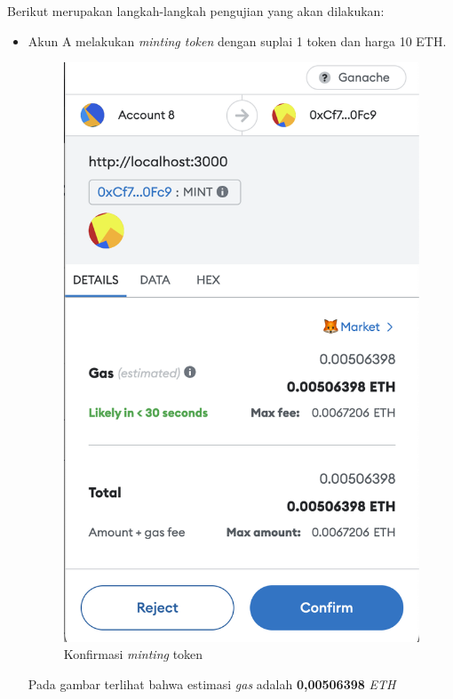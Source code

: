 Berikut merupakan langkah-langkah pengujian yang akan dilakukan:
\begin{itemize}
    \item Akun A melakukan \emph{minting token} dengan suplai 1 token dan harga 10 ETH.
    \begin{figure} [H] \centering
        \includegraphics[scale=0.4]{gambar/img-test-buy-mint-1.png}
        \caption{Konfirmasi \emph{minting} token}
        \label{fig:TestBuyKonfirmasiMintingToken}
      \end{figure}
    Pada gambar terlihat bahwa estimasi \emph{gas} adalah \textbf{0,00506398} \emph{ETH}
    \begin{figure} [H] \centering

\end{figure}
\end{itemize}
